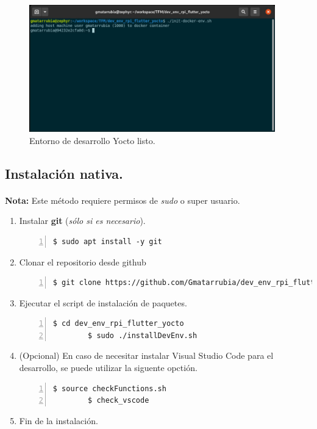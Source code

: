 \begin{figure}[H]
    \centering
    \includegraphics[width=0.95\textwidth]{imgs/yocto-docker-ready}
    \caption[yocto docker ready]{Entorno de desarrollo Yocto listo.}
    \label{imgs:yocto-docker-ready}
\end{figure}

\subsection{Instalación nativa.}

\paragraph{}\textbf{Nota:} Este método requiere permisos de \emph{sudo} o super usuario.

\begin{enumerate}
    \item Instalar \textbf{\gls{git}} (\emph{sólo si es necesario}).
    \begin{lstlisting}[style=consola, numbers=left]
        $ sudo apt install -y git
    \end{lstlisting}

    \item Clonar el repositorio desde github
    \begin{lstlisting}[style=consola, numbers=left]
        $ git clone https://github.com/Gmatarrubia/dev_env_rpi_flutter_yocto.git
    \end{lstlisting}

    \item Ejecutar el script de instalación de paquetes.
    \begin{lstlisting}[style=consola, numbers=left]
        $ cd dev_env_rpi_flutter_yocto
        $ sudo ./installDevEnv.sh
    \end{lstlisting}

    \item (Opcional) En caso de necesitar instalar Visual Studio Code para el desarrollo,
    se puede utilizar la siguente opctión.
    \begin{lstlisting}[style=consola, numbers=left]
        $ source checkFunctions.sh
        $ check_vscode
    \end{lstlisting}

    \item Fin de la instalación.
\end{enumerate}

